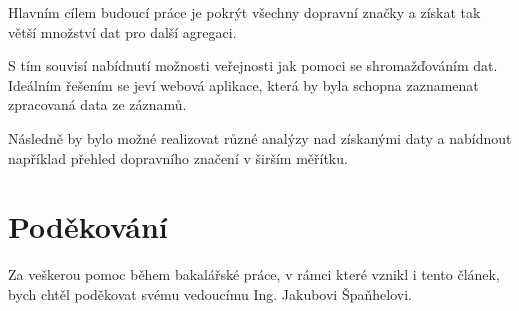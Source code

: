 \documentclass[czech]{ExcelAtFIT} %
\begin{document}
Hlavním cílem budoucí práce je pokrýt všechny dopravní značky a získat tak větší množství dat pro další agregaci.

S tím souvisí nabídnutí možnosti veřejnosti jak pomoci se shromažďováním dat. Ideálním řešením se jeví webová aplikace,  která by byla schopna  zaznamenat zpracovaná data ze záznamů. 

Následně by bylo možné  realizovat různé analýzy nad získanými daty a nabídnout například přehled dopravního značení v širším měřítku.


\section*{Poděkování}
Za veškerou pomoc během bakalářské práce, v rámci které vznikl i tento článek, bych chtěl poděkovat svému vedoucímu Ing. Jakubovi Špaňhelovi.





\end{document}

